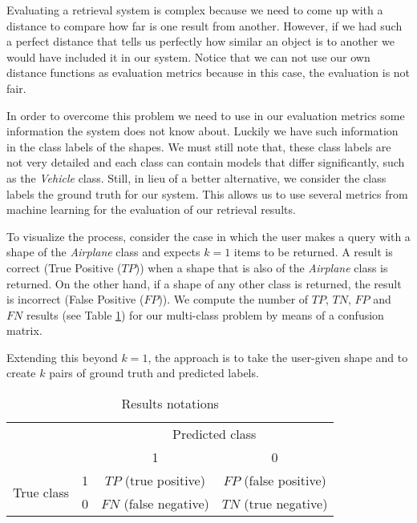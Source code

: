 Evaluating a retrieval system is complex because we need to come up with a distance to compare how far is one result from another.
However, if we had such a perfect distance that tells us perfectly how similar an object is to another we would have included it in our system.
Notice that we can not use our own distance functions as evaluation metrics because in this case, the evaluation is not fair.

In order to overcome this problem we need to use in our evaluation metrics some information the system does not know about.
Luckily we have such information in the class labels of the shapes.
We must still note that, these class labels are not very detailed and each class can contain models that differ significantly, such as the \textit{Vehicle} class.
Still, in lieu of a better alternative, we consider the class labels the ground truth for our system. 
This allows us to use several metrics from machine learning for the evaluation of our retrieval results.

To visualize the process, consider the case in which the user makes a query with a shape of the \textit{Airplane} class and expects $k=1$ items to be returned.
A result is correct (True Positive ($TP$)) when a shape that is also of the \textit{Airplane} class is returned.
On the other hand, if a shape of any other class is returned, the result is incorrect (False Positive ($FP$)).
We compute the number of $TP$, $TN$, $FP$ and $FN$ results (see Table \ref{tab:tp-tn-fp-fn}) for our multi-class problem by means of a confusion matrix.

Extending this beyond $k=1$, the approach is to take the user-given shape and to create $k$ pairs of ground truth and predicted labels.

\begin{table}[ht]
    \centering
    \begin{tabular}{c|c|c|c}
         \multicolumn{2}{c|}{} & \multicolumn{2}{c}{Predicted class} \\
        \cline{3-4}
         \multicolumn{2}{c|}{} & 1 & 0 \\
        \hline
        \multirow{2}{*}{True class} & 1 & $TP$ (true positive)  & $FP$ (false positive) \\
        \cline{2-4}
        & 0 & $FN$ (false negative) & $TN$ (true negative) \\
    \end{tabular}
    \caption{Results notations}
    \label{tab:tp-tn-fp-fn}
\end{table}

